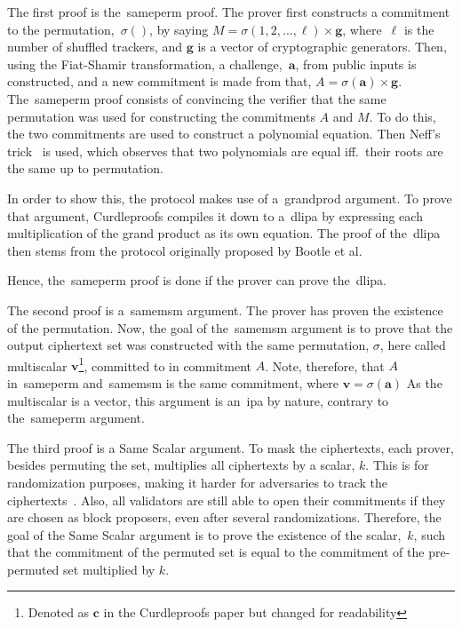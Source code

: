 The first proof is the~\gls{sameperm} proof.
The prover first constructs a commitment to the permutation,~$\sigma()$, by saying $M=\sigma(1,2,\dots,\ell)\times\mathbf{g}$, where~$\ell$ is the number of shuffled trackers, and $\mathbf{g}$ is a vector of cryptographic generators.
Then, using the Fiat-Shamir transformation, a challenge,~$\mathbf{a}$, from public inputs is constructed, and a new commitment is made from that, $A=\sigma(\mathbf{a})\times\mathbf{g}$.
The~\gls{sameperm} proof consists of convincing the verifier that the same permutation was used for constructing the commitments $A$ and $M$.
To do this, the two commitments are used to construct a polynomial equation.
Then Neff's trick~\cite{10.1145/501983.502000} is used, which observes that two polynomials are equal iff.\ their roots are the same up to permutation.

In order to show this, the protocol makes use of a~\gls{grandprod} argument.
To prove that argument, Curdleproofs compiles it down to a~\gls{dlipa} by expressing each multiplication of the grand product as its own equation.
The proof of the~\gls{dlipa} then stems from the protocol originally proposed by Bootle et al.~\cite{cryptoeprint:2016/263,Curdleproofs}

Hence, the~\gls{sameperm} proof is done if the prover can prove the~\gls{dlipa}.


The second proof is a~\gls{samemsm} argument.
The prover has proven the existence of the permutation.
Now, the goal of the~\gls{samemsm} argument is to prove that the output ciphertext set was constructed with the same permutation, $\sigma$, here called multiscalar $\mathbf{v}$\footnote{Denoted as $\mathbf{c}$ in the Curdleproofs paper but changed for readability}, committed to in commitment $A$.
Note, therefore, that $A$ in~\gls{sameperm} and~\gls{samemsm} is the same commitment, where $\mathbf{v}=\sigma(\mathbf{a})$
As the multiscalar is a vector, this argument is an~\gls{ipa} by nature, contrary to the~\gls{sameperm} argument.

The third proof is a Same Scalar argument.
To mask the ciphertexts, each prover, besides permuting the set, multiplies all ciphertexts by a scalar, $k$.
This is for randomization purposes, making it harder for adversaries to track the ciphertexts~\cite{Whisk2024}.
Also, all validators are still able to open their commitments if they are chosen as block proposers, even after several randomizations.
Therefore, the goal of the Same Scalar argument is to prove the existence of the scalar,~$k$, such that the commitment of the permuted set is equal to the commitment of the pre-permuted set multiplied by $k$.


